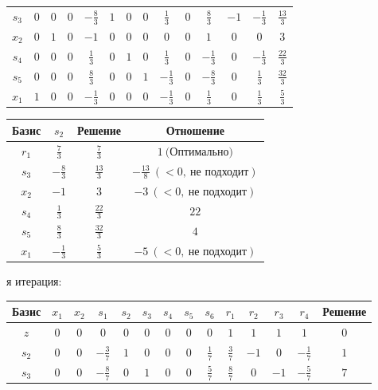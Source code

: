 \documentclass{article}%
\begin{document}
\begin{flushleft}
\begin{tabular}{|c|cccccccccccc|c|}
$s_{3}$&$0$&$0$&$0$&$-\frac{8}{3}$&$1$&$0$&$0$&$\frac{1}{3}$&$0$&$\frac{8}{3}$&$-1$&$-\frac{1}{3}$&$\frac{13}{3}$\\%
$x_{2}$&$0$&$1$&$0$&$-1$&$0$&$0$&$0$&$0$&$0$&$1$&$0$&$0$&$3$\\%
$s_{4}$&$0$&$0$&$0$&$\frac{1}{3}$&$0$&$1$&$0$&$\frac{1}{3}$&$0$&$-\frac{1}{3}$&$0$&$-\frac{1}{3}$&$\frac{22}{3}$\\%
$s_{5}$&$0$&$0$&$0$&$\frac{8}{3}$&$0$&$0$&$1$&$-\frac{1}{3}$&$0$&$-\frac{8}{3}$&$0$&$\frac{1}{3}$&$\frac{32}{3}$\\%
$x_{1}$&$1$&$0$&$0$&$-\frac{1}{3}$&$0$&$0$&$0$&$-\frac{1}{3}$&$0$&$\frac{1}{3}$&$0$&$\frac{1}{3}$&$\frac{5}{3}$\\%
\hline%
\end{tabular}%
\newline%
\newline%
\newline%
\begin{tabular}{|cccc|}%
\hline%
Базис&$s_{2}$&Решение&Отношение\\%
\hline%
$r_{1}$&$\frac{7}{3}$&$\frac{7}{3}$&$1\: \text{(Оптимально)}$\\%
$s_{3}$&$-\frac{8}{3}$&$\frac{13}{3}$&$-\frac{13}{8}\: (< 0, \: \text{не подходит})$\\%
$x_{2}$&$-1$&$3$&$-3\: (< 0, \: \text{не подходит})$\\%
$s_{4}$&$\frac{1}{3}$&$\frac{22}{3}$&$22$\\%
$s_{5}$&$\frac{8}{3}$&$\frac{32}{3}$&$4$\\%
$x_{1}$&$-\frac{1}{3}$&$\frac{5}{3}$&$-5\: (< 0, \: \text{не подходит})$\\%
\hline%
\end{tabular}%
\newline%
\newline%
я итерация: %
\newline%
\newline%
\renewcommand{\arraystretch}{1.3}%
\begin{tabular}{|c|cccccccccccc|c|}%
\hline%
Базис&$x_{1}$&$x_{2}$&$s_{1}$&$s_{2}$&$s_{3}$&$s_{4}$&$s_{5}$&$s_{6}$&$r_{1}$&$r_{2}$&$r_{3}$&$r_{4}$&Решение\\%
\hline%
$z$&$0$&$0$&$0$&$0$&$0$&$0$&$0$&$0$&$1$&$1$&$1$&$1$&$0$\\%
\hline%
$s_{2}$&$0$&$0$&$-\frac{3}{7}$&$1$&$0$&$0$&$0$&$\frac{1}{7}$&$\frac{3}{7}$&$-1$&$0$&$-\frac{1}{7}$&$1$\\%
$s_{3}$&$0$&$0$&$-\frac{8}{7}$&$0$&$1$&$0$&$0$&$\frac{5}{7}$&$\frac{8}{7}$&$0$&$-1$&$-\frac{5}{7}$&$7$\\%

\end{tabular}
\end{flushleft}
\end{document}
